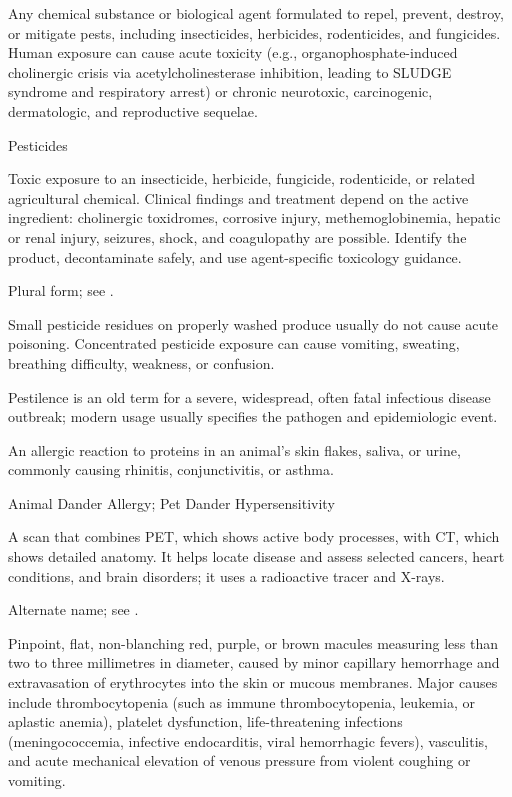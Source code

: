  Any chemical substance or biological agent formulated to repel, prevent, destroy, or mitigate pests, including insecticides, herbicides, rodenticides, and fungicides. Human exposure can cause acute toxicity (e.g., organophosphate-induced cholinergic crisis via acetylcholinesterase inhibition, leading to SLUDGE syndrome and respiratory arrest) or chronic neurotoxic, carcinogenic, dermatologic, and reproductive sequelae.

\synonyms
Pesticides

 Toxic exposure to an insecticide, herbicide, fungicide, rodenticide, or related agricultural chemical. Clinical findings and treatment depend on the active ingredient: cholinergic toxidromes, corrosive injury, methemoglobinemia, hepatic or renal injury, seizures, shock, and coagulopathy are possible. Identify the product, decontaminate safely, and use agent-specific toxicology guidance.

 Plural form; see .

 Small pesticide residues on properly washed produce usually do not cause acute poisoning. Concentrated pesticide exposure can cause vomiting, sweating, breathing difficulty, weakness, or confusion.

 Pestilence is an old term for a severe, widespread, often fatal infectious disease outbreak; modern usage usually specifies the pathogen and epidemiologic event.

 An allergic reaction to proteins in an animal's skin flakes, saliva, or urine, commonly causing rhinitis, conjunctivitis, or asthma.

\synonyms
Animal Dander Allergy; Pet Dander Hypersensitivity

 A scan that combines PET, which shows active body processes, with CT, which shows detailed anatomy. It helps locate disease and assess selected cancers, heart conditions, and brain disorders; it uses a radioactive tracer and X-rays.

 Alternate name; see .

 Pinpoint, flat, non-blanching red, purple, or brown macules measuring less than two to three millimetres in diameter, caused by minor capillary hemorrhage and extravasation of erythrocytes into the skin or mucous membranes. Major causes include thrombocytopenia (such as immune thrombocytopenia, leukemia, or aplastic anemia), platelet dysfunction, life-threatening infections (meningococcemia, infective endocarditis, viral hemorrhagic fevers), vasculitis, and acute mechanical elevation of venous pressure from violent coughing or vomiting.

